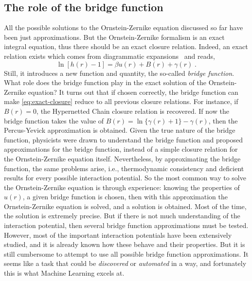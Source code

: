 \subsection{The role of the bridge function}
All the possible solutions to the Ornstein-Zernike equation discussed so far 
have been just approximations.
But the Ornstein-Zernike formalism is an exact integral equation, thus there should be an
exact closure relation. Indeed, an exact relation exists which comes from diagrammatic
expansions~\cite{hansenTheorySimpleLiquids2013} and reads,
\begin{equation}
    \ln{\left[h(r) - 1\right]} = \beta u(r) + B(r) + \gamma(r) \; .
    \label{eq:exact-closure}
\end{equation}
Still, it introduces a new function and quantity, the so-called \emph{bridge function}.
What role does the bridge function play in the exact solution of the Ornstein-Zernike
equation? It turns out that if chosen correctly, the bridge function can make
\autoref{eq:exact-closure} reduce to all previous closure relations. For instance,
if $B(r)=0$, the Hypernetted Chain closure relation is recovered. If now the bridge
function takes the value of $B(r)=\ln{ \{\gamma(r) + 1\} }-\gamma(r)$, then the 
Percus-Yevick approximation is obtained. Given the true nature of the bridge function,
physicists were drawn to understand the bridge function and proposed approximations for
the bridge function, instead of a simple closure relation for the Ornstein-Zernike
equation itself. Nevertheless, by approximating the bridge function, the same problems
arise, i.e., thermodynamic consistency and deficient results for every possible
interaction potential. So the most common way to solve the Ornstein-Zernike equation is through
experience: knowing the properties of $u(r)$, a given bridge function is chosen,
then with this approximation the Ornstein-Zernike equation is solved, and a solution is
obtained. Most of the time, the solution is extremely precise. But if there is not
much understanding of the interaction potential, then several bridge function approximations
must be tested. However, most of the important interaction potentials have been
extensively studied, and it is already known how these behave and their properties.
But it is still cumbersome to attempt to use all possible bridge function approximations.
It seems like a task that could be \emph{discovered} or \emph{automated} in a way, and
fortunately this is what Machine Learning excels at.